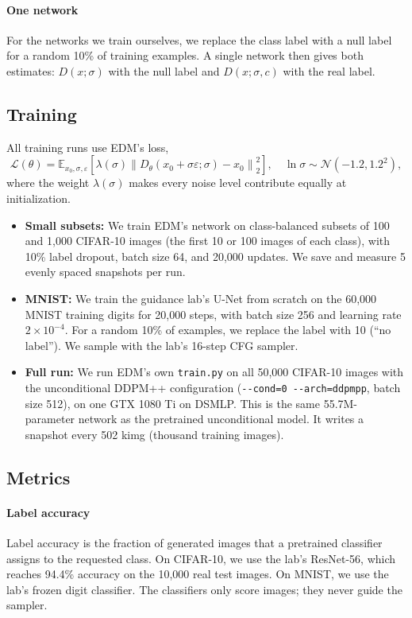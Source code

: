 \documentclass[12pt,letterpaper]{article}
\begin{document}
\paragraph{One network}
For the networks we train ourselves, we replace the class label with a null label for a random 10\% of training examples.
A single network then gives both estimates: \(D(x; \sigma)\) with the null label and \(D(x; \sigma, c)\) with the real label.

\subsection{Training}

All training runs use EDM's loss,
\[
    \mathcal{L}(\theta) = \mathbb{E}_{x_0, \sigma, \varepsilon} \left[ \lambda(\sigma) \left\| D_\theta(x_0 + \sigma \varepsilon; \sigma) - x_0 \right\|_2^2 \right] ,
    \quad \ln \sigma \sim \mathcal{N}(-1.2, 1.2^2) ,
\]
where the weight \(\lambda(\sigma)\) makes every noise level contribute equally at initialization.

\begin{itemize}
    \item \textbf{Small subsets:} We train EDM's network on class-balanced subsets of 100 and 1,000 CIFAR-10 images (the first 10 or 100 images of each class), with 10\% label dropout, batch size 64, and 20,000 updates.
    We save and measure 5 evenly spaced snapshots per run.
    \item \textbf{MNIST:} We train the guidance lab's U-Net from scratch on the 60,000 MNIST training digits for 20,000 steps, with batch size 256 and learning rate \(2 \times 10^{-4}\).
    For a random 10\% of examples, we replace the label with 10 (``no label'').
    We sample with the lab's 16-step CFG sampler.
    \item \textbf{Full run:} We run EDM's own \texttt{train.py} on all 50,000 CIFAR-10 images with the unconditional DDPM++ configuration (\texttt{-{}-cond=0 -{}-arch=ddpmpp}, batch size 512), on one GTX 1080 Ti on DSMLP.
    This is the same 55.7M-parameter network as the pretrained unconditional model.
    It writes a snapshot every 502 kimg (thousand training images).
\end{itemize}

\subsection{Metrics}

\paragraph{Label accuracy}
Label accuracy is the fraction of generated images that a pretrained classifier assigns to the requested class.
On CIFAR-10, we use the lab's ResNet-56, which reaches 94.4\% accuracy on the 10,000 real test images.
On MNIST, we use the lab's frozen digit classifier.
The classifiers only score images; they never guide the sampler.
\end{document}

